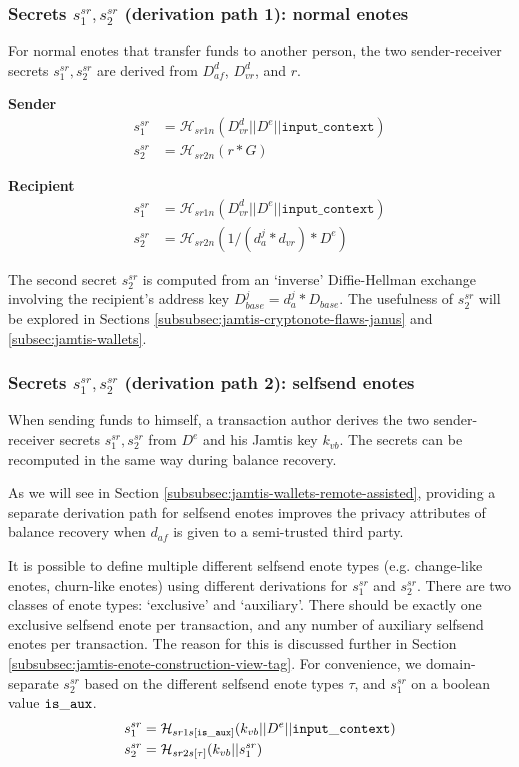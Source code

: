 \subsubsection{Secrets $s^{sr}_1, s^{sr}_2$ (derivation path 1): normal enotes}
\label{subsubsec:jamtis-srsecret-derivation-normal}

For normal enotes that transfer funds to another person, the two sender-receiver secrets $s^{sr}_1, s^{sr}_2$ are derived from $D^d_{af}$, $D^d_{vr}$, and $r$.

\textbf{Sender}
\begin{align*}
    s^{sr}_1 &= \mathcal{H}_{sr1n}(D^d_{vr} || D^e || \texttt{input\_context}) \\
    s^{sr}_2 &= \mathcal{H}_{sr2n}(r * G)
\end{align*}

\textbf{Recipient}
\begin{align*}
    s^{sr}_1 &= \mathcal{H}_{sr1n}(D^d_{vr} || D^e || \texttt{input\_context}) \\
    s^{sr}_2 &= \mathcal{H}_{sr2n}(1/(d^j_a * d_{vr}) * D^e)
\end{align*}

The second secret $s^{sr}_2$ is computed from an `inverse' Diffie-Hellman exchange involving the recipient's address key $D^j_{base} = d^j_a * D_{base}$. The usefulness of $s^{sr}_2$ will be explored in Sections \ref{subsubsec:jamtis-cryptonote-flaws-janus} and \ref{subsec:jamtis-wallets}.

\subsubsection{Secrets $s^{sr}_1, s^{sr}_2$ (derivation path 2): selfsend enotes}
\label{subsubsec:jamtis-srsecret-derivation-selfsend}

When sending funds to himself, a transaction author derives the two sender-receiver secrets $s^{sr}_1, s^{sr}_2$ from $D^e$ and his Jamtis key $k_{vb}$. The secrets can be recomputed in the same way during balance recovery.

As we will see in Section \ref{subsubsec:jamtis-wallets-remote-assisted}, providing a separate derivation path for selfsend enotes improves the privacy attributes of balance recovery when $d_{af}$ is given to a semi-trusted third party.

It is possible to define multiple different selfsend enote types (e.g. change-like enotes, churn-like enotes) using different derivations for $s^{sr}_1$ and $s^{sr}_2$. There are two classes of enote types: `exclusive' and `auxiliary'. There should be exactly one exclusive selfsend enote per transaction, and any number of auxiliary selfsend enotes per transaction. The reason for this is discussed further in Section \ref{subsubsec:jamtis-enote-construction-view-tag}. For convenience, we domain-separate $s^{sr}_2$ based on the different selfsend enote types $\tau$, and $s^{sr}_1$ on a boolean value $\tt{is\_aux}$.
\begin{align*}
    s^{sr}_1 &= \mathcal{H}_{sr1s[\tt{is\_aux}]}(k_{vb} || D^e || {\tt input\_context}) \\
    s^{sr}_2 &= \mathcal{H}_{sr2s[\tau]}(k_{vb} || s^{sr}_1)
\end{align*}

